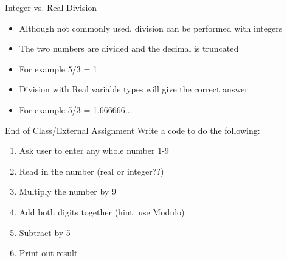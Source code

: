\documentclass{beamer}
\begin{document}
\begin{frame}{Integer vs. Real Division}
  \begin{itemize}
    \item Although not commonly used, division can be performed with integers
    \vfill\item The two numbers are divided and the decimal is truncated
    \vfill\item For example 5/3 = 1
    \vfill\item Division with Real variable types will give the correct answer
    \vfill\item For example 5/3 = 1.666666...
  \end{itemize}
\end{frame}
\begin{frame}{End of Class/External Assignment}
Write a code to do the following:
\begin{enumerate}
  \item Ask user to enter any whole number 1-9
  \vfill\item Read in the number (real or integer??)
  \vfill\item Multiply the number by 9
  \vfill\item Add both digits together (hint: use Modulo)
  \vfill\item Subtract by 5
  \vfill\item Print out result \\ \vfill
{}
\end{enumerate}
\end{frame}
\end{document}
